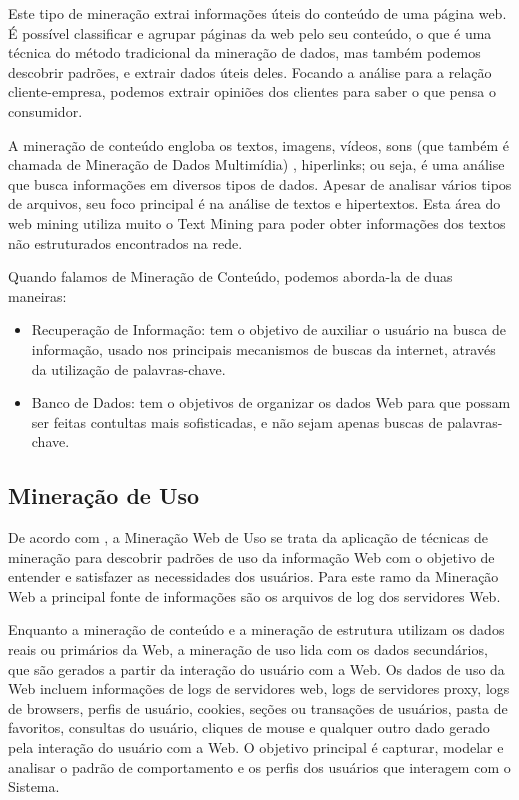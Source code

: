 	Este tipo de mineração extrai informações úteis do conteúdo de uma página web. É possível classificar e agrupar páginas da web pelo seu conteúdo, o que é uma técnica do método tradicional da mineração de dados, mas também podemos descobrir padrões, e extrair dados úteis deles. Focando a análise para a relação cliente-empresa, podemos extrair opiniões dos clientes para saber o que pensa o consumidor.

	A mineração de conteúdo engloba os textos, imagens, vídeos, sons (que também é chamada de Mineração de Dados Multimídia) , hiperlinks; ou seja, é uma análise que busca informações em diversos tipos de dados.  Apesar de analisar vários tipos de arquivos, seu foco principal é na análise de textos e hipertextos. Esta área do web mining utiliza muito o Text Mining para poder obter informações dos textos não estruturados encontrados na rede.

	Quando falamos de Mineração de Conteúdo, podemos aborda-la de duas maneiras:

\begin{itemize}
\item 	Recuperação de Informação: tem o objetivo de auxiliar o usuário na busca de informação, usado nos principais mecanismos de buscas da internet, através da utilização de palavras-chave.
\item 	Banco de Dados: tem o objetivos de organizar os dados Web para que possam ser feitas contultas mais sofisticadas, e não sejam apenas buscas de palavras-chave.
\end{itemize}

\subsection{Mineração de Uso}

    De acordo com \cite{Escobar}, a Mineração Web de Uso se trata da aplicação de técnicas de mineração para descobrir padrões de uso da informação Web com o objetivo de entender e satisfazer as necessidades dos usuários. Para este ramo da Mineração Web a principal fonte de informações são os arquivos de log dos servidores Web.

	Enquanto a mineração de conteúdo e a mineração de estrutura utilizam os dados reais ou primários da Web, a mineração de uso lida com os dados secundários, que são gerados a partir da interação do usuário com a Web. Os dados de uso da Web incluem informações de logs de servidores web, logs de servidores proxy, logs de browsers, perfis de usuário, cookies, seções ou transações de usuários, pasta de favoritos, consultas do usuário, cliques de mouse e qualquer outro dado gerado pela interação do usuário com a Web.\cite{Girardi} O objetivo principal é capturar, modelar e analisar o padrão de comportamento e os perfis dos usuários que interagem com o Sistema.

